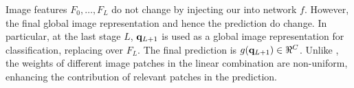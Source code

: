 Image features $F_0, \dots, F_L$ do not change by injecting our \Ours into network $f$. However, the final global image representation and hence the prediction do change. In particular, at the last stage $L$, $\mathbf{q}_{L+1}$ is used as a global image representation for classification, replacing \gap over $F_L$. The final prediction is $g(\vq_{L+1}) \in \real^C$. Unlike \gap, the weights of different image patches in the linear combination are non-uniform, enhancing the contribution of relevant patches in the prediction.

